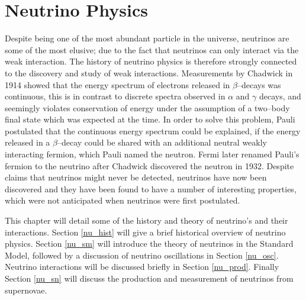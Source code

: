 \chapter{\label{ch:neutrinophysics}Neutrino Physics} 



 

\minitoc

Despite being one of the most abundant particle in the universe, neutrinos are 
some of the most elusive; due to the fact that neutrinos can only interact via
the weak interaction. The history of neutrino physics is therefore strongly
connected to the discovery and study of weak interactions. Measurements by
Chadwick in 1914 showed that the energy spectrum of electrons released in
$\beta$--decays was continuous, this is in contrast to discrete spectra
observed in $\alpha$ and $\gamma$ decays, and seemingly violates
conservation of energy under the assumption of a two--body final state which was
expected at the time. In order to solve this problem, Pauli postulated that the 
continuous energy spectrum could be explained, if the energy released in a 
$\beta$--decay could be shared with an additional neutral weakly interacting 
fermion, which Pauli named the neutron. Fermi later renamed Pauli's fermion to 
the neutrino after Chadwick discovered the neutron in 1932. Despite claims that 
neutrinos might never be detected, neutrinos have now been discovered and they 
have been found to have a number of interesting properties, which were not 
anticipated when neutrinos were first postulated. 

This chapter will detail some of the history and theory of neutrino's and their 
interactions. Section \ref{nu_hist} will give a brief historical overview of 
neutrino physics. Section \ref{nu_sm} will introduce the theory of neutrinos 
in the Standard Model, followed by a discussion of neutrino oscillations in 
Section \ref{nu_osc}. Neutrino interactions will be discussed briefly in 
Section \ref{nu_prod}. Finally Section \ref{nu_sn} will discuss the production 
and measurement of neutrinos from supernovae.

